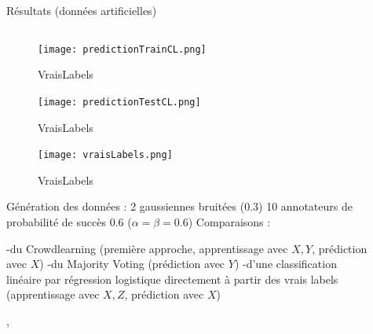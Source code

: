 \documentclass[final]{beamer}
\newlength{\sepwid}
\newlength{\onecolwid}
\newlength{\twocolwid}
\begin{document}
\begin{frame}[t]
\begin{columns}[t]
\begin{column}{\twocolwid}
\begin{alertblock}{Résultats (données artificielles)}
\begin{columns}[t,totalwidth=0.45\paperwidth]
\begin{column}{\onecolwid}

\begin{figure}
    \centering
    \texttt{[image: predictionTrainCL.png]}
    \caption{VraisLabels}
    \label{fig:my_label}
\end{figure}
\begin{figure}
    \centering
    \texttt{[image: predictionTestCL.png]}
    \caption{VraisLabels}
    \label{fig:my_label}
\end{figure}

\begin{figure}
    \centering
    \texttt{[image: vraisLabels.png]}
    \caption{VraisLabels}
    \label{fig:my_label}
\end{figure}

Génération des données : 2 gaussiennes bruitées (0.3)
10 annotateurs de probabilité de succès 0.6 ($\alpha=\beta=0.6$)
Comparaisons :
\begin{itemize}
-du Crowdlearning (première approche, apprentissage avec $X,Y$, prédiction avec $X$)
-du Majority Voting (prédiction avec $Y$)
-d'une classification linéaire par régression logistique directement à partir des vrais labels (apprentissage avec $X,Z$, prédiction avec $X$)
\end{itemize},


\end{column} %

\end{columns} %

\end{alertblock}

\end{column} %

\begin{column}{\sepwid}\end{column} %


\begin{column}{\onecolwid} %


\end{column}
\end{columns}
\end{frame}
\end{document}
